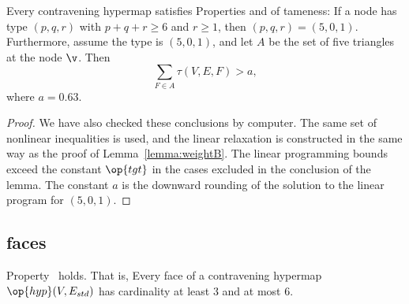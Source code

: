 \begin{lemma}[]\label{lemma:degE}
  Every contravening hypermap satisfies Properties 
  and 
of tameness: 
If a node has type $(p,q,r)$ with $p+q+r\ge 6$ and $r\ge 1$, then $(p,q,r)=(5,0,1)$. 
Furthermore, assume the type is $(5,0,1)$, and let $A$ be the set of five triangles at the
node $\v$.  Then
%
\[ 
\sum_{F\in A} \tau(V,E,F) > a,
\] 
where $a=0.63$.
\end{lemma}



\begin{proof}  We have also checked these conclusions by computer.
  The same set of nonlinear inequalities is used, and the linear
  relaxation is constructed in the same way as the proof of Lemma~\ref{lemma:weightB}.  The linear programming
  bounds exceed the constant $\op{tgt}$ in the cases excluded in the
  conclusion of the lemma.  The constant $a$ is the downward rounding
  of the solution to the linear program for $(5,0,1)$.
\end{proof}
%

%

\subsection{faces}



\begin{lemma}[]  \label{lemma:face-size}
  Property~ holds.  That is, Every face of a
  contravening hypermap $\op{hyp}(V,E_{std})$ has cardinality at least
  $3$ and at most $6$.
\end{lemma}

